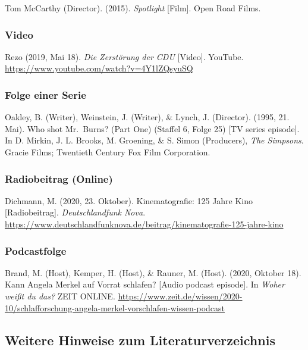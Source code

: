 \documentclass[
  letterpaper,
  DIV=11]{scrreprt}
\begin{document}
Tom McCarthy (Director). (2015). \emph{Spotlight} {[}Film{]}. Open Road
Films.

\hypertarget{video}{%
\subsubsection{Video}\label{video}}

Rezo (2019, Mai 18). \emph{Die Zerstörung der CDU} {[}Video{]}. YouTube.
\url{https://www.youtube.com/watch?v=4Y1lZQsyuSQ}

\hypertarget{folge-einer-serie}{%
\subsubsection{Folge einer Serie}\label{folge-einer-serie}}

Oakley, B. (Writer), Weinstein, J. (Writer), \& Lynch, J. (Director).
(1995, 21. Mai). Who shot Mr.~Burns? (Part One) (Staffel 6, Folge 25)
{[}TV series episode{]}. In D. Mirkin, J. L. Brooks, M. Groening, \& S.
Simon (Producers), \emph{The Simpsons}. Gracie Films; Twentieth Century
Fox Film Corporation.

\hypertarget{radiobeitrag-online}{%
\subsubsection{Radiobeitrag (Online)}\label{radiobeitrag-online}}

Dichmann, M. (2020, 23. Oktober). Kinematografie: 125 Jahre Kino
{[}Radiobeitrag{]}. \emph{Deutschlandfunk Nova}.
\url{https://www.deutschlandfunknova.de/beitrag/kinematografie-125-jahre-kino}

\hypertarget{podcastfolge}{%
\subsubsection{Podcastfolge}\label{podcastfolge}}

Brand, M. (Host), Kemper, H. (Host), \& Rauner, M. (Host). (2020,
Oktober 18). Kann Angela Merkel auf Vorrat schlafen? {[}Audio podcast
episode{]}. In \emph{Woher weißt du das?} ZEIT ONLINE.
\url{https://www.zeit.de/wissen/2020-10/schlafforschung-angela-merkel-vorschlafen-wissen-podcast}

\hypertarget{weitere-hinweise-zum-literaturverzeichnis}{%
\subsection{Weitere Hinweise zum
Literaturverzeichnis}\label{weitere-hinweise-zum-literaturverzeichnis}}
\end{document}
